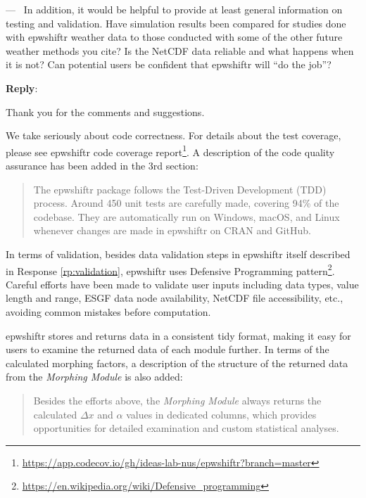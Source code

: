 \documentclass[11pt]{article}
\newcounter{reviewer}
\newcounter{point}[reviewer]
\renewcommand{\thepoint}{P\,\thereviewer.\arabic{point}}
\newenvironment{point}
   {\refstepcounter{point} \bigskip \noindent {\textbf{Reviewer~Point~\thepoint} } ---\ }
   {\par }
\newenvironment{reply}
   {\medskip \noindent \textbf{Reply}:\  }
   {\medskip }
\begin{document}
\begin{point}
In addition, it would be helpful to provide at least general information on
testing and validation. Have simulation results been compared for studies done
with epwshiftr weather data to those conducted with some of the other future
weather methods you cite? Is the NetCDF data reliable and what happens when it
is not? Can potential users be confident that epwshiftr will ``do the job''?

\end{point}

\begin{reply}

Thank you for the comments and suggestions.

We take seriously about code correctness. For details about the test coverage,
please see epwshiftr code coverage
report\footnote{\url{https://app.codecov.io/gh/ideas-lab-nus/epwshiftr?branch=master}}. A
description of the code quality assurance has been added in the 3rd section:

\begin{quote}
The epwshiftr package follows the Test-Driven Development (TDD) process. Around
450 unit tests are carefully made, covering 94\% of the codebase. They are
automatically run on Windows, macOS, and Linux whenever changes are made in
epwshiftr on CRAN and GitHub.
\end{quote}

In terms of validation, besides data validation steps in epwshiftr itself
described in Response \ref{rp:validation}, epwshiftr uses Defensive Programming
pattern\footnote{\url{https://en.wikipedia.org/wiki/Defensive_programming}}. Careful efforts
have been made to validate user inputs including data types, value length and
range, ESGF data node availability, NetCDF file accessibility, etc., avoiding
common mistakes before computation.

epwshiftr stores and returns data in a consistent tidy format, making it easy
for users to examine the returned data of each module further. In terms of the
calculated morphing factors, a description of the structure of the returned data
from the \emph{Morphing Module} is also added:

\begin{quote}
Besides the efforts above, the \emph{Morphing Module} always returns the calculated
\(\Delta x\) and \(\alpha\) values in dedicated columns, which provides
opportunities for detailed examination and custom statistical analyses.
\end{quote}

\end{reply}
\end{document}
